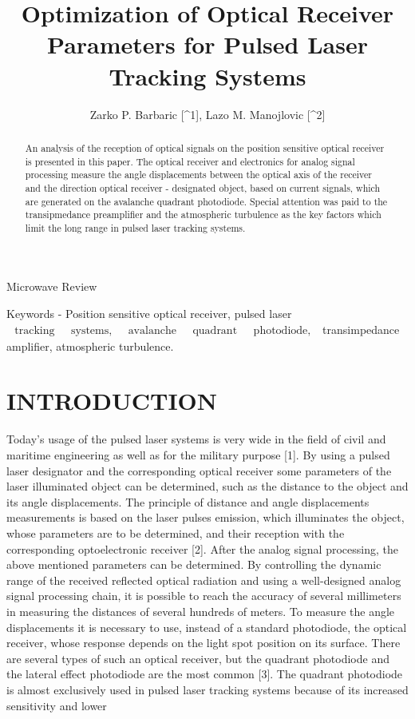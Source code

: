 \documentclass[10pt]{article}
\title{Optimization of Optical Receiver Parameters for Pulsed Laser Tracking Systems }
\author{Zarko P. Barbaric [\^{}1], Lazo M. Manojlovic [\^{}2]}
\date{}
\begin{document}
\maketitle
Microwave Review



\begin{abstract}
An analysis of the reception of optical signals on the position sensitive optical receiver is presented in this paper. The optical receiver and electronics for analog signal processing measure the angle displacements between the optical axis of the receiver and the direction optical receiver - designated object, based on current signals, which are generated on the avalanche quadrant photodiode. Special attention was paid to the transipmedance preamplifier and the atmospheric turbulence as the key factors which limit the long range in pulsed laser tracking systems.
\end{abstract}

Keywords - Position sensitive optical receiver, pulsed laser \(\begin{array}{lllll}\text { tracking } & \text { systems, } & \text { avalanche } & \text { quadrant } & \text { photodiode, }\end{array}\) transimpedance amplifier, atmospheric turbulence.

\section{INTRODUCTION}
Today's usage of the pulsed laser systems is very wide in the field of civil and maritime engineering as well as for the military purpose [1]. By using a pulsed laser designator and the corresponding optical receiver some parameters of the laser illuminated object can be determined, such as the distance to the object and its angle displacements. The principle of distance and angle displacements measurements is based on the laser pulses emission, which illuminates the object, whose parameters are to be determined, and their reception with the corresponding optoelectronic receiver [2]. After the analog signal processing, the above mentioned parameters can be determined. By controlling the dynamic range of the received reflected optical radiation and using a well-designed analog signal processing chain, it is possible to reach the accuracy of several millimeters in measuring the distances of several hundreds of meters. To measure the angle displacements it is necessary to use, instead of a standard photodiode, the optical receiver, whose response depends on the light spot position on its surface. There are several types of such an optical receiver, but the quadrant photodiode and the lateral effect photodiode are the most common [3]. The quadrant photodiode is almost exclusively used in pulsed laser tracking systems because of its increased sensitivity and lower
\end{document}
